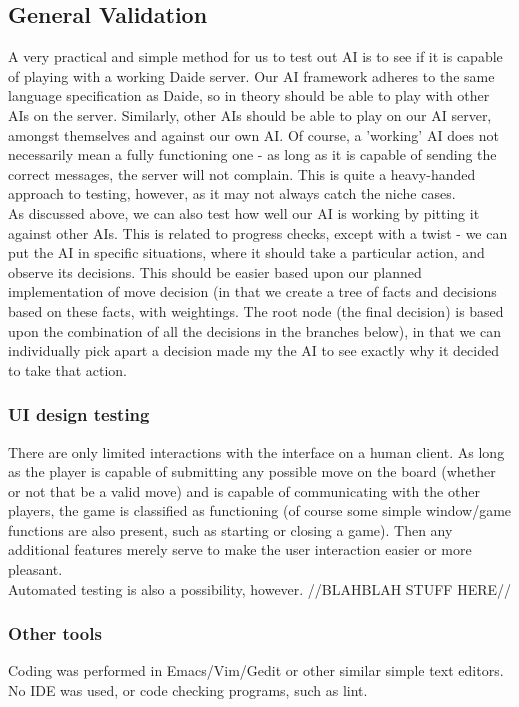\documentclass[12pt]{article}
\begin{document}
\subsection{General Validation}
A very practical and simple method for us to test out AI is to see if it is capable of playing with a working Daide server. Our AI framework adheres to the same language specification as Daide, so in theory should be able to play with other AIs on the server. Similarly, other AIs should be able to play on our AI server, amongst themselves and against our own AI. Of course, a 'working' AI does not necessarily mean a fully functioning one - as long as it is capable of sending the correct messages, the server will not complain. This is quite a heavy-handed approach to testing, however, as it may not always catch the niche cases.
\\
As discussed above, we can also test how well our AI is working by pitting it against other AIs. This is related to progress checks, except with a twist - we can put the AI in specific situations, where it should take a particular action, and observe its decisions. This should be easier based upon our planned implementation of move decision (in that we create a tree of facts and decisions based on these facts, with weightings. The root node (the final decision) is based upon the combination of all the decisions in the branches below), in that we can individually pick apart a decision made my the AI to see exactly why it decided to take that action.

\subsubsection{UI design testing}
There are only limited interactions with the interface on a human client. As long as the player is capable of submitting any possible move on the board (whether or not that be a valid move) and is capable of communicating with the other players, the game is classified as functioning (of course some simple window/game functions are also present, such as starting or closing a game). Then any additional features merely serve to make the user interaction easier or more pleasant.
\\
Automated testing is also a possibility, however. //BLAHBLAH STUFF HERE//

\subsubsection{Other tools}
Coding was performed in Emacs/Vim/Gedit or other similar simple text editors. No IDE was used, or code checking programs, such as lint.
\end{document}
